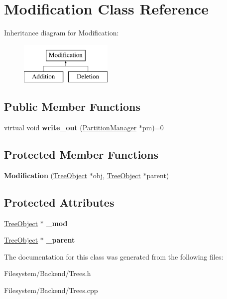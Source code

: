 \hypertarget{classModification}{}\section{Modification Class Reference}
\label{classModification}
Inheritance diagram for Modification\+:\begin{figure}[H]
\begin{center}
\leavevmode
\includegraphics[height=2.000000cm]{classModification}
\end{center}
\end{figure}
\subsection*{Public Member Functions}
\begin{DoxyCompactItemize}
\item 
\mbox{\label{classModification_a50d1fd809524902d2a1e78d02f4be1dc}} 
virtual void {\bfseries write\+\_\+out} (\mbox{\hyperlink{classPartitionManager}{Partition\+Manager}} $\ast$pm)=0
\end{DoxyCompactItemize}
\subsection*{Protected Member Functions}
\begin{DoxyCompactItemize}
\item 
\mbox{\label{classModification_a76407b8c6d2adb840dceea708355aba8}} 
{\bfseries Modification} (\mbox{\hyperlink{classTreeObject}{Tree\+Object}} $\ast$obj, \mbox{\hyperlink{classTreeObject}{Tree\+Object}} $\ast$parent)
\end{DoxyCompactItemize}
\subsection*{Protected Attributes}
\begin{DoxyCompactItemize}
\item 
\mbox{\label{classModification_a0aa2f9924cde904b1683f3bd80d87a02}} 
\mbox{\hyperlink{classTreeObject}{Tree\+Object}} $\ast$ {\bfseries \+\_\+mod}
\item 
\mbox{\label{classModification_a529d02be9866b96746bcae63a763f868}} 
\mbox{\hyperlink{classTreeObject}{Tree\+Object}} $\ast$ {\bfseries \+\_\+parent}
\end{DoxyCompactItemize}


The documentation for this class was generated from the following files\+:\begin{DoxyCompactItemize}
\item 
Filesystem/\+Backend/Trees.\+h\item 
Filesystem/\+Backend/Trees.\+cpp\end{DoxyCompactItemize}

